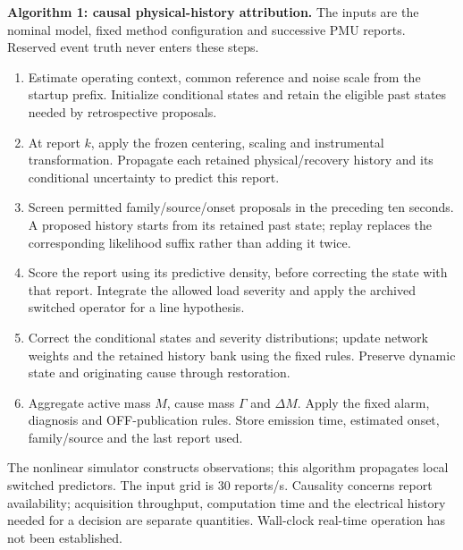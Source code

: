 \noindent\textbf{Algorithm 1: causal physical-history attribution.}
The inputs are the nominal model, fixed method configuration and successive
PMU reports. Reserved event truth never enters these steps.
\begin{enumerate}
\item Estimate operating context, common reference and noise scale from the
startup prefix. Initialize conditional states and retain the eligible past
states needed by retrospective proposals.
\item At report $k$, apply the frozen centering, scaling and instrumental
transformation. Propagate each retained physical/recovery history and its
conditional uncertainty to predict this report.
\item Screen permitted family/source/onset proposals in the preceding ten
seconds. A proposed history starts from its retained past state; replay
replaces the corresponding likelihood suffix rather than adding it twice.
\item Score the report using its predictive density, before correcting
the state with that report. Integrate the allowed load severity and apply
the archived switched operator for a line hypothesis.
\item Correct the conditional states and severity distributions; update
network weights and the retained history bank using the fixed rules.
Preserve dynamic state and originating cause through restoration.
\item Aggregate active mass $M$, cause mass $\Gamma$ and $\Delta M$.
Apply the fixed alarm, diagnosis and OFF-publication rules. Store emission
time, estimated onset, family/source and the last report used.
\end{enumerate}
The nonlinear simulator constructs observations; this algorithm propagates
local switched predictors. The input grid is 30 reports/s. Causality
concerns report availability; acquisition throughput, computation time
and the electrical history needed for a decision are separate quantities.
Wall-clock real-time operation has not been established.
